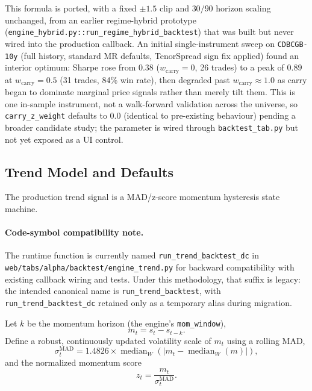 This formula is ported, with a fixed $\pm1.5$ clip and $30/90$ horizon scaling
unchanged, from an earlier regime-hybrid prototype
(\texttt{engine\_hybrid.py::run\_regime\_hybrid\_backtest}) that was built but never
wired into the production callback. An initial single-instrument sweep on
\texttt{CDBCGB-10y} (full history, standard MR defaults, TenorSpread sign fix applied)
found an interior optimum: Sharpe rose from $0.38$ ($w_{\mathrm{carry}}=0$, 26 trades)
to a peak of $0.89$ at $w_{\mathrm{carry}}=0.5$ (31 trades, 84\% win rate), then
degraded past $w_{\mathrm{carry}}\approx1.0$ as carry began to dominate marginal price
signals rather than merely tilt them. This is one in-sample instrument, not a
walk-forward validation across the universe, so \texttt{carry\_z\_weight} defaults to
$0.0$ (identical to pre-existing behaviour) pending a broader candidate study; the
parameter is wired through \texttt{backtest\_tab.py} but not yet exposed as a UI
control.

\subsection{Trend Model and Defaults}
\label{sec:pairs-trend-model}

The production trend signal is a MAD/z-score momentum hysteresis state machine.
\paragraph{Code-symbol compatibility note.} The runtime function is currently named
\texttt{run\_trend\_backtest\_dc} in
\texttt{web/tabs/alpha/backtest/engine\_trend.py} for backward compatibility with
existing callback wiring and tests. Under this methodology, that suffix is legacy:
the intended canonical name is \texttt{run\_trend\_backtest}, with
\texttt{run\_trend\_backtest\_dc} retained only as a temporary alias during
migration.

Let $k$ be the momentum horizon (the engine's \texttt{mom\_window}),
\begin{equation}
m_t = s_t - s_{t-k}.
\end{equation}
Define a robust, continuously updated volatility scale of $m_t$ using a rolling MAD,
\begin{equation}
\sigma_t^{\mathrm{MAD}} = 1.4826\times
\operatorname{median}_{W}\!\left(\left|m_t-
\operatorname{median}_{W}(m)\right|\right),
\end{equation}
and the normalized momentum score
\begin{equation}
z_t = \frac{m_t}{\sigma_t^{\mathrm{MAD}}}.
\end{equation}

